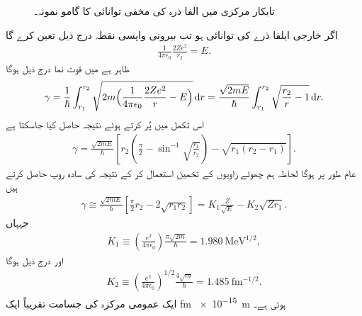 \begin{figure}
\centering
{}
\caption{تابکار مرکزی میں الفا ذرہ کی مخفی توانائی کا گامو نمونہ۔}
\label{شکل_وکب_گامو_نمونہ}
\end{figure}


اگر خارجی ایلفا ذرے کی توانائی  ہو تب بیرونی واپسی نقطہ  درج ذیل تعین کرے گا
\begin{align}
	\frac{1}{4\pi\epsilon_{0}}\frac{2Ze^{2}}{r_{2}}=E.
\end{align}
ظاہر ہے  میں قوت نما  درج ذیل ہوگا
\begin{align*}
	\gamma=\frac{1}{\hslash}\int^{r_{2}}_{r_{1}}\sqrt{2m\Big(\frac{1}{4\pi\epsilon_{0}}\frac{2Ze^{2}}{r}-E\Big)}\dif r=\frac{\sqrt{2mE}}{\hslash}\int^{r_{2}}_{r_{1}}\sqrt{\frac{r_{2}}{r}-1}\dif r.
\end{align*}
اس تکمل میں  پُر کرتے ہوئے نتیجہ حاصل کیا جاسکتا ہے
\begin{align}
	\gamma=\frac{\sqrt{2mE}}{\hslash}\left[r_{2}\left(\frac{\pi}{2}-\sin^{-1}\sqrt{\frac{r_{1}}{r_{2}}}\right)-\sqrt{r_{1}(r_{2}-r_{1})}\right].
\end{align}
عام طور پر  ہوگا لحاظہ ہم چھوٹے زاویوں کے تخمین  استعمال کر کے نتیجہ کی سادہ روپ حاصل کرتے ہیں
\begin{align}
	\gamma\cong\frac{\sqrt{2mE}}{\hslash}\left[\frac{\pi}{2}r_{2}-2\sqrt{r_{1}r_{2}}\right]=K_{1}\frac{Z}{\sqrt{E}}-K_{2}\sqrt{Zr_{1}}.
\end{align}
جہہاں 
\begin{align}
	K_{1} \equiv \left(\frac{e^{2}}{4\pi\epsilon_{0}}\right)\frac{\pi\sqrt{2m}}{\hslash}= \SI{1.980}{\mega\electronvolt^{1/2}},
\end{align}
اور درج ذیل ہوگا
\begin{align}
	K_{2} \equiv \left(\frac{e^{2}}{4\pi\epsilon_{0}}\right)^{1/2}\frac{4\sqrt{m}}{\hslash}= \SI{1.485}{\femto\meter^{-1/2}}.
\end{align}
ایک عمومی مرکزہ کی جسامت تقریباً ایک \si{\femto\meter} \SI{e-15}{\meter} ہوتی ہے۔

